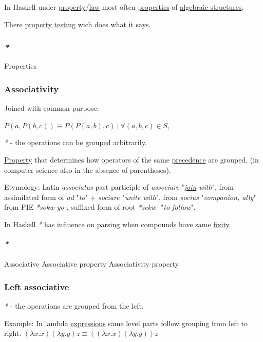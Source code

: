 \documentclass[a4paper,14pt,oneside]{book}
\begin{document}
In Haskell under \hyperref[orgcd82c84]{property}/\hyperref[orgc42595d]{law} most often \hyperref[org2e72dee]{properties} of \hyperref[org9605677]{algebraic structures}.

There \hyperref[orgbf37195]{property testing} wich does what it says.

\subsubsection{\emph{*}}
\label{sec:orgd82db4f}

\label{org2e72dee}Properties

\subsubsection{\label{orge2a8a79}Associativity}
\label{sec:orgdec41b5}
Joined with common purpose.

\(P(a,P(b,c)) \equiv P(P(a,b),c) \ | \ \forall (a,b,c) \in S\),

\emph{*} - the operations can be grouped arbitrarily.

\hyperref[orgcd82c84]{Property} that determines how operators of the same \hyperref[org454a4b0]{precedence} are grouped, (in computer science also in the absence of parentheses).

Etymology:
Latin \emph{associatus} past participle of \emph{associare} "\emph{\hyperref[org8441e0c]{join} with}", from assimilated form of \emph{ad} "\emph{to}" + \emph{sociare} "\emph{unite with}", from \emph{socius} "\emph{companion, ally}" from PIE \emph{*sokw-yo-}, suffixed form of root \emph{*sekw-} "\emph{to follow}".

In Haskell \emph{*} has influence on parsing when compounds have same \hyperref[orgea19789]{fixity}.

\paragraph{\emph{*}}
\label{sec:orgf6d821c}

\label{org4101409}Associative
\label{orgd17ee92}Associative property
\label{org653126e}Associativity property

\subsubsection{\label{orga126def}Left associative}
\label{sec:org9c699f9}
\emph{*} - the operations are grouped from the left.

Example:
In lambda \hyperref[orga8ffba3]{expressions} same level parts follow grouping from left to right.
\((\lambda x . x)(\lambda y . y)z \equiv ((\lambda x . x)(\lambda y . y))z\)
\end{document}

